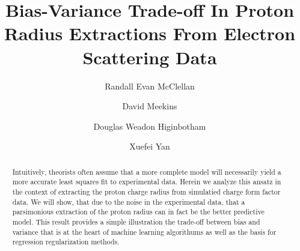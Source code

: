 \documentclass[10pt,aps,prc,twocolumn]{revtex4-1}
\begin{document}
\title{Bias-Variance Trade-off In Proton Radius Extractions From Electron Scattering Data} 

\author{Randall Evan McClellan}
\author{David Meekins} 
\author{Douglas Weadon Higinbotham}
\author{Xuefei Yan}

\begin{abstract}
Intuitively, theorists often assume that a more complete model will necessarily yield a more 
accurate least squares fit to experimental data.   Herein we analyze this ansatz in the context of extracting 
the proton charge radius from simulatied charge form factor data.
We will show, that due to the noise in the experimental data,
that a parsimonious extraction of the proton radius can in fact be the better predictive model.  This result 
provides a simple illustration the trade-off between bias and variance that is at the
heart of machine learning algorithums as well as the basis for regression regularization methods.

\end{abstract}

%
%
%
%
%
%
%
%
%
%
%
\end{document}
